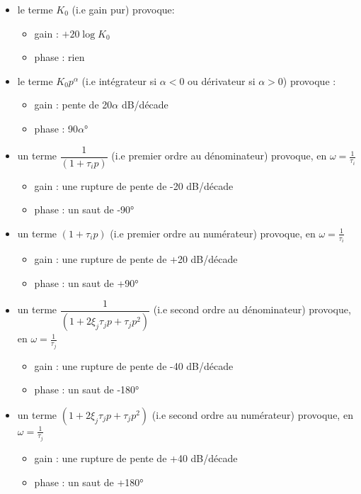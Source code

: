 \begin{itemize}
    \item le terme $K_0$ (i.e gain pur) provoque:
        \begin{itemize}
            \item gain  : $+20\log{K_0}$
            \item phase : rien 
        \end{itemize}
    \item le terme $K_0p^{\alpha}$ (i.e intégrateur si $\alpha<0$ ou dérivateur si $\alpha>0$)
        provoque :
        \begin{itemize}
            \item gain  : pente de 20$\alpha$ dB/décade 
            \item phase : 90$\alpha$\si{\degree}
        \end{itemize}
    \item un terme $\dfrac{1}{(1+\tau_ip)}$ (i.e premier ordre au dénominateur) provoque, en $\omega=\frac{1}{\tau_i}$
        \begin{itemize}
            \item gain  : une rupture de pente de -20 dB/décade 
            \item phase : un saut de -90\si{\degree}
        \end{itemize}
    \item un terme $(1+\tau_ip)$ (i.e premier ordre au numérateur) provoque, en $\omega=\frac{1}{\tau_i}$
        \begin{itemize}
            \item gain  : une rupture de pente de +20 dB/décade 
            \item phase : un saut de +90\si{\degree}
        \end{itemize}
    \item un terme $\dfrac{1}{(1+2\xi_j\tau_jp+\tau_jp^2)}$ (i.e second ordre au dénominateur) provoque, en $\omega=\frac{1}{\tau_j}$
        \begin{itemize}
            \item gain  : une rupture de pente de -40 dB/décade 
            \item phase : un saut de -180\si{\degree}
        \end{itemize}
    \item un terme $(1+2\xi_j\tau_jp+\tau_jp^2)$ (i.e second ordre au numérateur) provoque, en $\omega=\frac{1}{\tau_j}$
        \begin{itemize}
            \item gain  : une rupture de pente de +40 dB/décade 
            \item phase : un saut de +180\si{\degree}
        \end{itemize}
\end{itemize}

